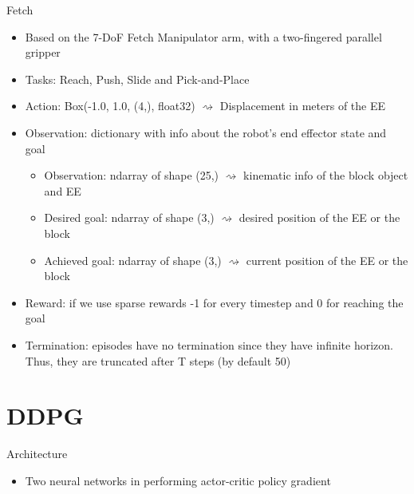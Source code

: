 \documentclass{beamer}
\begin{document}
      \begin{frame}{Fetch}
            \begin{itemize}
                  \item Based on the 7-DoF Fetch Manipulator arm, with a two-fingered parallel gripper
                  \item Tasks: Reach, Push, Slide and Pick-and-Place
                  \item Action: Box(-1.0, 1.0, (4,), float32) $\rightsquigarrow$ Displacement in meters of the EE 
                  \item Observation: dictionary with info about the robot’s end effector state and goal
                        \begin{itemize}
                              \item Observation: ndarray of shape (25,) $\rightsquigarrow$ kinematic info of the block object and EE
                              \item Desired goal: ndarray of shape (3,) $\rightsquigarrow$ desired position of the EE or the block
                              \item Achieved goal: ndarray of shape (3,) $\rightsquigarrow$ current position of the EE or the block
                        \end{itemize}
                  \item Reward: if we use sparse rewards -1 for every timestep and 0 for reaching the goal
                  \item Termination: episodes have no termination since they have infinite horizon. Thus, they are truncated after T steps (by default 50)
            \end{itemize}
      \end{frame}

\section{DDPG}

      \begin{frame}[fragile]{Architecture}
            \begin{itemize}
                  \item Two neural networks in performing actor-critic policy gradient
                  \begin{columns}
                        
                        
                    \end{columns} 
            \end{itemize}
      \end{frame}
\end{document}
